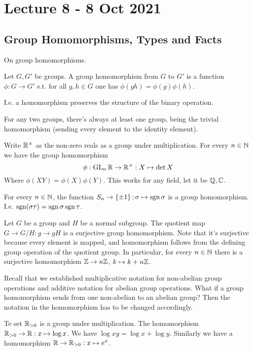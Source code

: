 \section{Lecture 8 - 8 Oct 2021}
\subsection{Group Homomorphisms, Types and Facts}
On group homomorphisms. 
\begin{definition}
  Let $G,G'$ be groups. A group homomorphism from $G$ to $G'$ is a function $\phi:G\to G'$
  s.t. for all $g,h\in G$ one has $\phi(gh)=\phi(g) \phi(h)$.
  \label{groupHomomorphism}
\end{definition}
I.e. a homomorphism preserves the structure of the binary operation.

\begin{example}
  For any two groups, there's always at least one group, being the trivial homomorphism
  (sending every element to the identity element).
\end{example}

\begin{example}
  Write $\mathbb R^{\times}$ as the non-zero reals as a group under multiplication. For every $n\in\mathbb N$
  we have the group homomorphism
  \[ \phi: \operatorname{GL}_n \mathbb R \to \mathbb R^{\times}:X\mapsto \det X\]
  Where $\phi(XY)=\phi(X)\phi(Y)$. This works for any field, let it be $\mathbb Q,\mathbb C$.
\end{example}

\begin{example}
  For every $n\in\mathbb N$, the function $S_n\to \left\{ \pm 1 \right\}; \sigma\mapsto
  \operatorname{sgn}\sigma$ is a group homomorphism. I.e. $\operatorname{sgn} (\sigma\tau) = \operatorname{sgn} \sigma \operatorname{sgn}
  \tau$.
\end{example}

\begin{example}
  Let $G$ be a group and $H$ be a normal subgroup. The quotient map $G\to G/H : g\to gH$
  is a surjective group homomorphism. Note that it's surjective because every element is
  mapped, and homomorphism follows from the defining group operation of the quotient
  group. In particular, for every $n\in\mathbb N$ there is a surjective homomorphism $\mathbb Z\to
  n\mathbb Z$, $k\mapsto k+n\mathbb Z$.
\end{example}

Recall that we established multiplicative notation for non-abelian group operations and
additive notation for abelian group operations. What if a group homomorphism sends from
one non-abelian to an abelian group? Then the notation in the homomorphism has to be
changed accordingly.
\begin{example}
  Te set $\mathbb R_{>0}$ is a group under multiplication. The homomorphism $\mathbb R_{>0}\to
  \mathbb R:x\mapsto \log x$. We have $\log xy = \log x + \log y$. Similarly we have a
  homomorphism $\mathbb R\to\mathbb R_{>0} : x\mapsto e^{x}$.
\end{example}

